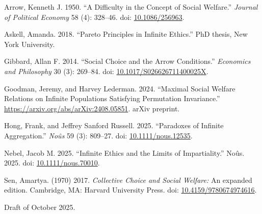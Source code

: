 \documentclass[
  11pt,
  letterpaper,
  DIV=11,
  numbers=noendperiod,
  twoside]{scrartcl}
\newlength{\cslhangindent}
\newenvironment{CSLReferences}[2] %
 {\begin{list}{}{%
  \setlength{\itemindent}{0pt}
  \setlength{\leftmargin}{0pt}
  \setlength{\parsep}{0pt}
  \ifodd #1
   \setlength{\leftmargin}{\cslhangindent}
   \setlength{\itemindent}{-1\cslhangindent}
  \fi
  \setlength{\itemsep}{#2\baselineskip}}}
 {\end{list}}
\begin{document}
\label{refs}
\begin{CSLReferences}{1}{0}
Arrow, Kenneth J. 1950. {``A Difficulty in the Concept of Social
Welfare.''} \emph{Journal of Political Economy} 58 (4): 328--46. doi:
\href{https://doi.org/10.1086/256963}{10.1086/256963}.

Askell, Amanda. 2018. {``Pareto Principles in Infinite Ethics.''} PhD
thesis, New York University.

Gibbard, Allan F. 2014. {``Social Choice and the Arrow Conditions.''}
\emph{Economics and Philosophy} 30 (3): 269--84. doi:
\href{https://doi.org/10.1017/S026626711400025X}{10.1017/S026626711400025X}.

Goodman, Jeremy, and Harvey Lederman. 2024. {``Maximal Social Welfare
Relations on Infinite Populations Satisfying Permutation Invariance.''}
\url{https://arxiv.org/abs/arXiv:2408.05851}. arXiv preprint.

Hong, Frank, and Jeffrey Sanford Russell. 2025. {``Paradoxes of Infinite
Aggregation.''} \emph{Noûs} 59 (3): 809--27. doi:
\href{https://doi.org/10.1111/nous.12535}{10.1111/nous.12535}.

Nebel, Jacob M. 2025. {``Infinite Ethics and the Limits of
Impartiality.''} No{û}s. 2025. doi:
\href{https://doi.org/10.1111/nous.70010}{10.1111/nous.70010}.

Sen, Amartya. (1970) 2017. \emph{Collective Choice and Social Welfare:}
An expanded edition. Cambridge, MA: Harvard University Press. doi:
\href{https://doi.org/10.4159/9780674974616}{10.4159/9780674974616}.

\end{CSLReferences}



Draft of October 2025.
\end{document}
